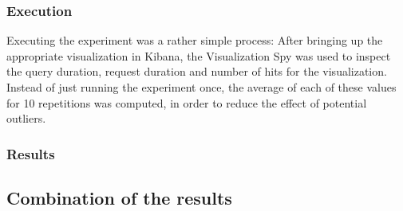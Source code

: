 %

\subsubsection{Execution}

Executing the experiment was a rather simple process:
After bringing up the appropriate visualization in Kibana, the Visualization Spy was used to inspect the query duration, request duration and number of hits for the visualization.
Instead of just running the experiment once, the average of each of these values for 10 repetitions was computed, in order to reduce the effect of potential outliers.

\subsubsection{Results}

\subsection{Combination of the results}
\label{subsec:evaluation:performance:insights}

